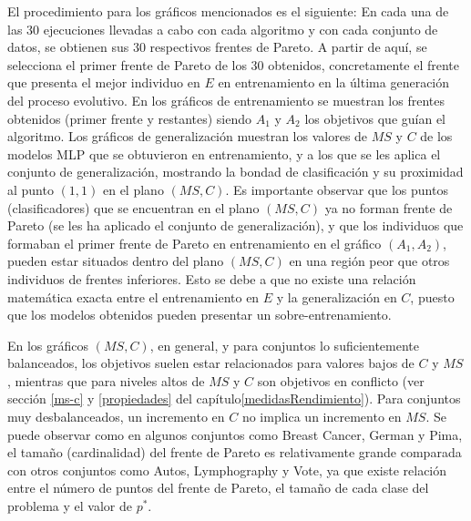 El procedimiento para los gráficos mencionados es el siguiente:
En cada una de las 30 ejecuciones llevadas a cabo con cada algoritmo y con cada
conjunto de datos, se obtienen sus 30 respectivos frentes de Pareto. A partir de aquí, se
selecciona el primer frente de Pareto de los 30 obtenidos, concretamente el frente que
presenta el mejor individuo en $E$ en entrenamiento en la última generación del
proceso evolutivo. En los gráficos de entrenamiento se muestran los frentes obtenidos
(primer frente y restantes) siendo $A_{1}$ y $A_{2}$ los objetivos que guían el algoritmo.
Los gráficos de generalización muestran los valores de $MS$ y $C$ de los modelos MLP que
se obtuvieron en entrenamiento, y a los que se les aplica el conjunto de
generalización,
mostrando la bondad de clasificación y su proximidad al punto $(1,1)$ en el plano
$(MS,C)$. Es importante observar que los puntos (clasificadores) que se encuentran en el
plano $(MS,C)$ ya no forman frente de Pareto (se les ha aplicado el conjunto de
generalización), y que los individuos que formaban el primer frente de Pareto en
entrenamiento en el gráfico $(A_{1},A_{2})$, pueden estar situados dentro del plano
$(MS,C)$ en una región peor que otros individuos de frentes inferiores. Esto se debe a
que no existe una relación matemática exacta entre el entrenamiento en $E$ y la
generalización en $C$, puesto que los modelos obtenidos pueden presentar un
sobre-entrenamiento.

En los gráficos $(MS,C)$, en general, y para conjuntos lo suficientemente
balanceados, los objetivos suelen estar relacionados para valores bajos de $C$ y $MS$,
mientras que para niveles altos de $MS$ y $C$ son objetivos en conflicto (ver sección
\ref{ms-c} y \ref{propiedades} del capítulo\ref{medidasRendimiento}). Para
conjuntos muy desbalanceados, un incremento en $C$ no implica un incremento en
$MS$. Se puede observar como en algunos conjuntos como Breast Cancer, German y
Pima, el tamaño (cardinalidad) del frente de Pareto es relativamente grande comparada con
otros conjuntos como Autos, Lymphography y Vote, ya que existe relación entre el número de
puntos del frente de Pareto, el tamaño de cada clase del problema y el valor de $p^*$.

